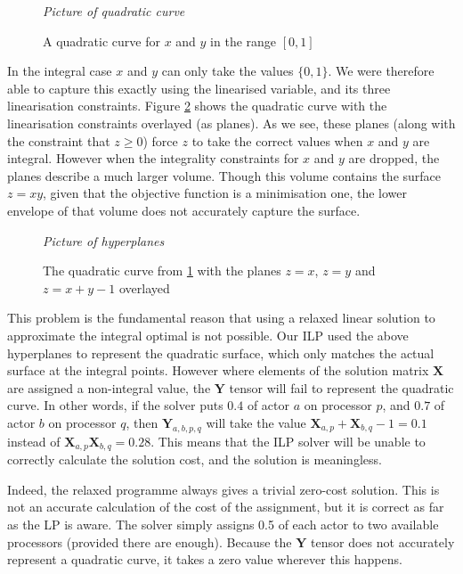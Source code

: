 \begin{figure}
\begin{center}
	{\em Picture of quadratic curve}
\caption{A quadratic curve for $x$ and $y$ in the range $[0,1]$}
\label{figAlgQuadratic}
\end{center}
\end{figure}

In the integral case $x$ and $y$ can only take the values $\{0,1\}$.
We were therefore able to capture this exactly using the linearised variable, and its three linearisation constraints.
Figure \ref{figAlgPlanes} shows the quadratic curve with the linearisation constraints overlayed (as planes).
As we see, these planes (along with the constraint that $z \geq 0$) force $z$ to take the correct values when $x$ and $y$ are integral.
However when the integrality constraints for $x$ and $y$ are dropped, the planes describe a much larger volume.
Though this volume contains the surface $z = xy$, given that the objective function is a minimisation one, the lower envelope of that volume does not accurately capture the surface.

\begin{figure}
\begin{center}
	{\em Picture of hyperplanes}
\caption{The quadratic curve from \ref{figAlgQuadratic} with the planes $z=x$, $z=y$ and $z=x+y-1$ overlayed}
\label{figAlgPlanes}
\end{center}
\end{figure}

This problem is the fundamental reason that using a relaxed linear solution to approximate the integral optimal is not possible.
Our ILP used the above hyperplanes to represent the quadratic surface, which only matches the actual surface at the integral points.
However where elements of the solution matrix $\mathbf{X}$ are assigned a non-integral value, the $\mathbf{Y}$ tensor will fail to represent the quadratic curve.
In other words, if the solver puts $0.4$ of actor $a$ on processor $p$, and $0.7$ of actor $b$ on processor $q$, then $\mathbf{Y}_{a,b,p,q}$ will take the value $\mathbf{X}_{a,p} + \mathbf{X}_{b,q} - 1 = 0.1$ instead of $\mathbf{X}_{a,p} \mathbf{X}_{b,q} = 0.28$.
This means that the ILP solver will be unable to correctly calculate the solution cost, and the solution is meaningless.

Indeed, the relaxed programme always gives a trivial zero-cost solution.
This is not an accurate calculation of the cost of the assignment, but it is correct as far as the LP is aware.
The solver simply assigns 0.5 of each actor to two available processors (provided there are enough).
Because the $\mathbf{Y}$ tensor does not accurately represent a quadratic curve, it takes a zero value wherever this happens.

